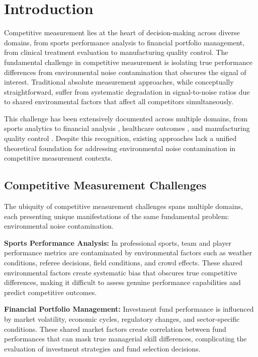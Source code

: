\section{Introduction}

Competitive measurement lies at the heart of decision-making across diverse domains, from sports performance analysis to financial portfolio management, from clinical treatment evaluation to manufacturing quality control. The fundamental challenge in competitive measurement is isolating true performance differences from environmental noise contamination that obscures the signal of interest. Traditional absolute measurement approaches, while conceptually straightforward, suffer from systematic degradation in signal-to-noise ratios due to shared environmental factors that affect all competitors simultaneously.

This challenge has been extensively documented across multiple domains, from sports analytics \cite{bennett2019descriptive, scott2023performance} to financial analysis \cite{carhart1997persistence, sharpe1994sharpe}, healthcare outcomes \cite{iezzoni1997risk, normand2016statistical}, and manufacturing quality control \cite{stefani2011measurement}. Despite this recognition, existing approaches lack a unified theoretical foundation for addressing environmental noise contamination in competitive measurement contexts.

\subsection{Competitive Measurement Challenges}

The ubiquity of competitive measurement challenges spans multiple domains, each presenting unique manifestations of the same fundamental problem: environmental noise contamination.

\textbf{Sports Performance Analysis:}
In professional sports, team and player performance metrics are contaminated by environmental factors such as weather conditions, referee decisions, field conditions, and crowd effects. These shared environmental factors create systematic bias that obscures true competitive differences, making it difficult to assess genuine performance capabilities and predict competitive outcomes.

\textbf{Financial Portfolio Management:}
Investment fund performance is influenced by market volatility, economic cycles, regulatory changes, and sector-specific conditions. These shared market factors create correlation between fund performances that can mask true managerial skill differences, complicating the evaluation of investment strategies and fund selection decisions.

